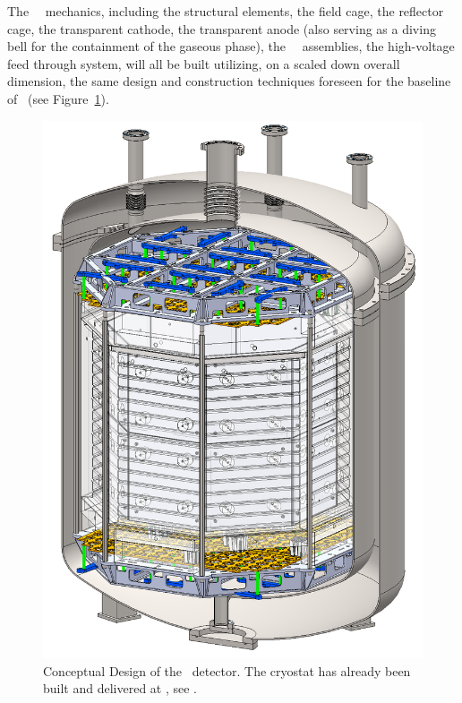 The \DSps\ \TPC\ mechanics, including the structural elements, the field cage, the reflector cage, the transparent cathode, the transparent anode (also serving as a diving bell for the containment of the gaseous phase), the \SiPM\ \DSkPdm\ assemblies, the high-voltage feed through system, will all be built utilizing, on a scaled down overall dimension, the same design and construction techniques foreseen for the baseline of \DSks\ (see Figure~\ref{fig:proto_1ton}). 

\begin{figure}[!t]
\centering
\includegraphics[height=0.95\textheight]{./Figures/proto_1ton.png}
\caption[Conceptual design of the \DSps\ detector]{Conceptual Design of the \DSps\ detector.  The cryostat has already been built and delivered at \CERN, see .}
\label{fig:proto_1ton}
\end{figure}

